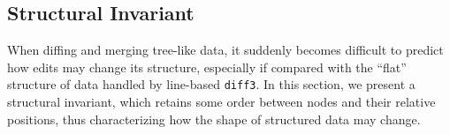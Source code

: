 \documentclass{sigplanconf}
\theoremstyle{plain}
\begin{document}

   		
\subsection{Structural Invariant}
When diffing and merging tree-like data, it suddenly becomes difficult
to predict how edits may change its structure, especially if
compared with the ``flat'' structure of data handled by line-based
\texttt{diff3}.
%
In this section, we present a structural invariant, which retains some
order between nodes and their relative positions, thus characterizing
how the shape of structured data may change.
%    
\end{document}
